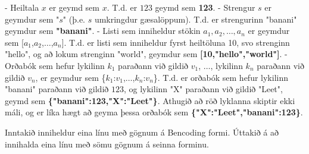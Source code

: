 - Heiltala $x$ er geymd sem $x$. T.d. er $123$ geymd sem \textbf{123}.
- Strengur $s$ er geymdur sem "$s$" (þ.e. $s$ umkringdur gæsalöppum). T.d. er
  strengurinn "banani" geymdur sem \textbf{"banani"}.
- Listi sem inniheldur stökin $a_1, a_2, \ldots, a_n$ er geymdur sem
  [$a_1$,$a_2$,$\ldots$,$a_n$]. T.d. er listi sem inniheldur fyrst heiltöluna
  10, svo strenginn "hello", og að lokum strenginn "world", geymdur sem
  \textbf{[10,"hello","world"]}.
- Orðabók sem hefur lykilinn $k_1$ paraðann við gildið $v_1$, $\ldots$,
  lykilinn $k_n$ paraðann við gildið $v_n$, er geymdur sem
  \{$k_1$:$v_1$,$\ldots$,$k_n$:$v_n$\}. T.d. er orðabók sem hefur lykilinn
  "banani" paraðann við gildið $123$, og lykilinn "X" paraðann við gildið
  "Leet", geymd sem \textbf{\{"banani":123,"X":"Leet"\}}. Athugið að röð lyklanna
  skiptir ekki máli, og er líka hægt að geyma þessa orðabók sem
  \textbf{\{"X":"Leet","banani":123\}}.

Inntakið inniheldur eina línu með gögnum á Bencoding formi. Úttakið á að
innihalda eina línu með sömu gögnum á seinna forminu.


